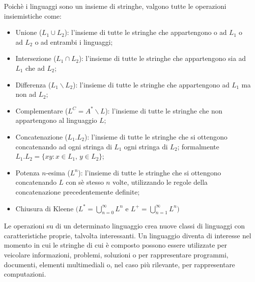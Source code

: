   \noindent 
  Poichè i linguaggi sono un insieme di stringhe, valgono tutte le operazioni insiemistiche come:
  \begin{itemize}
    \item Unione (\(L_1\cup L_2\)): l'insieme di tutte le stringhe che appartengono o ad \(L_1\) o ad \(L_2\) o ad entrambi i linguaggi;
    \item Intersezione (\(L_1 \cap L_2\)): l'insieme di tutte le stringhe che appartengono sia ad \(L_1\) che ad \(L_2\);
    \item Differenza (\(L_1\backslash L_2\)): l'insieme di tutte le stringhe che appartengono ad \(L_1\) ma non ad \(L_2\);
    \item Complementare (\(L^C = A^* \backslash L\)): l'insieme di tutte le stringhe che non appartengono al linguaggio \(L\);
    \item Concatenazione (\(L_1.L_2\)): l'insieme di tutte le stringhe che si ottengono concatenando ad ogni stringa di \(L_1\) ogni stringa di \(L_2\); formalmente \(L_1.L_2=\{xy:x\in L_1, \, y\in L_2\}\);
    \item Potenza \(n\)-esima (\(L^n\)): l'insieme di tutte le stringhe che si ottengono concatenando \(L\) con sè stesso \(n\) volte, utilizzando le regole della concatenazione precedentemente definite;
    \item Chiusura di Kleene \(\biggl(\displaystyle L^*=\bigcup_{n=0}^\infty L^n\) e \(\displaystyle L^+=\bigcup_{n=1}^\infty L^n\biggr)\)
  \end{itemize}
  Le operazioni su di un determinato linguaggio crea nuove classi di linguaggi con caratteristiche proprie, talvolta interessanti. Un linguaggio diventa di interesse nel momento in cui le stringhe di cui è composto possono essere utilizzate per veicolare informazioni, problemi, soluzioni o per rappresentare programmi, documenti, elementi multimediali o, nel caso più rilevante, per rappresentare computazioni.